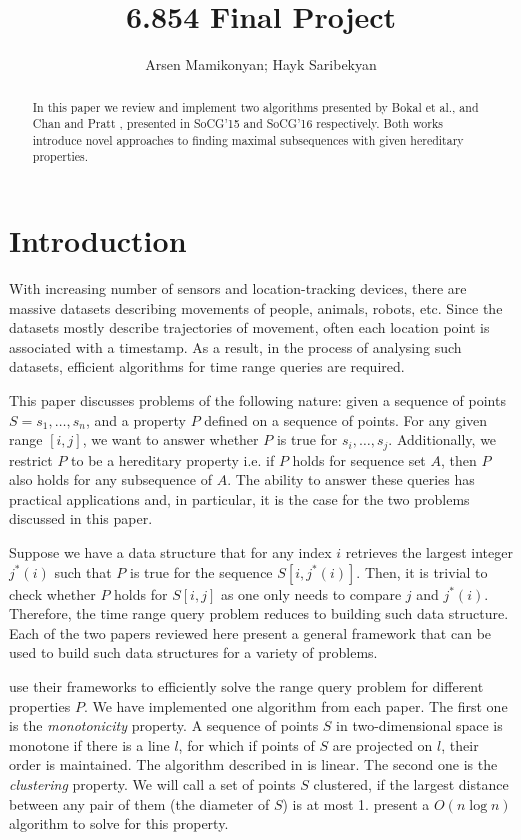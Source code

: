 \documentclass{article}
\begin{document}
\title{6.854 Final Project}
\author{Arsen Mamikonyan; Hayk Saribekyan}


\maketitle

\begin{abstract}
    In this paper we review and implement two algorithms presented by Bokal et al.\cite{bokal_et_al:LIPIcs:2015:5113}, and Chan and Pratt \cite{chan_et_al:LIPIcs:2016:5920}, presented in SoCG'15 and SoCG'16 respectively. Both works introduce novel approaches to finding maximal subsequences with given hereditary properties.
\end{abstract}

\section{Introduction}

With increasing number of sensors and location-tracking devices, there are massive datasets describing movements of people, animals, robots, etc. Since the datasets mostly describe trajectories of movement, often each location point is associated with a timestamp. As a result, in the process of analysing such datasets, efficient algorithms for time range queries are required.

This paper discusses problems of the following nature: given a sequence of points $S = s_1, \dots, s_n$, and a property $P$ defined on a sequence of points. For any given range $[i, j]$, we want to answer whether $P$ is true for $s_i, \dots, s_j$. Additionally, we restrict $P$ to be a hereditary property i.e. if $P$ holds for sequence set $A$, then $P$ also holds for any subsequence of $A$. The ability to answer these queries has practical applications and, in particular, it is the case for the two problems discussed in this paper.

Suppose we have a data structure that for any index $i$ retrieves the largest integer $j^*(i)$ such that $P$ is true for the sequence $S[i, j^*(i)]$. Then, it is trivial to check whether $P$ holds for $S[i, j]$ as one only needs to compare $j$ and $j^*(i)$. Therefore, the time range query problem reduces to building such data structure. Each of the two papers reviewed here present a general framework that can be used to build such data structures for a variety of problems.

\cite{bokal_et_al:LIPIcs:2015:5113,chan_et_al:LIPIcs:2016:5920} use their frameworks to efficiently solve the range query problem for different properties $P$. We have implemented one algorithm from each paper. The first one is the \textit{monotonicity} property. A sequence of points $S$ in two-dimensional space is monotone if there is a line $l$, for which if points of $S$ are projected on $l$, their order is maintained. The algorithm described in \cite{bokal_et_al:LIPIcs:2015:5113} is linear. The second one is the \textit{clustering} property. We will call a set of points $S$ clustered, if the largest distance between any pair of them (the diameter of $S$) is at most 1. \cite{chan_et_al:LIPIcs:2016:5920} present a $O(n\log n)$ algorithm to solve for this property.
\end{document}
